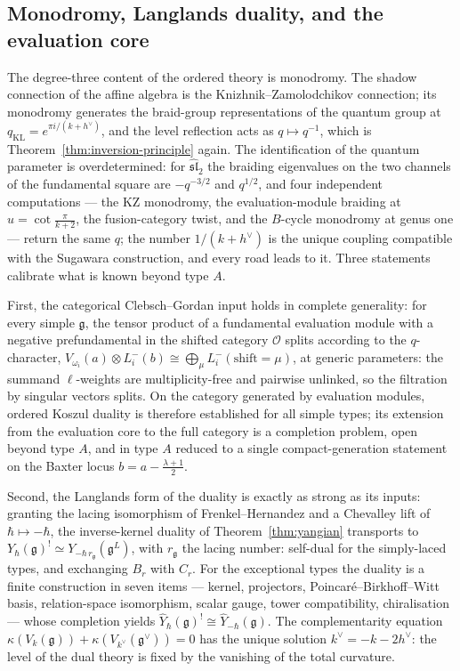 \documentclass[11pt]{amsart}
\numberwithin{equation}{section}
\theoremstyle{plain}
\theoremstyle{definition}
\theoremstyle{remark}
\newcommand{\fg}{\mathfrak{g}}
\newcommand{\dvee}{h^{\vee}}
\begin{document}
\subsection{Monodromy, Langlands duality, and the evaluation core}

The degree-three content of the ordered theory is monodromy. The shadow
connection of the affine algebra is the Knizhnik--Zamolodchikov
connection; its monodromy generates the braid-group representations of
the quantum group at $q_{\mathrm{KL}}=e^{\pi i/(k+\dvee)}$, and the
level reflection acts as $q\mapsto q^{-1}$, which is
Theorem~\ref{thm:inversion-principle} again. The identification of the
quantum parameter is overdetermined: for $\widehat{\mathfrak{sl}}_2$ the
braiding eigenvalues on the two channels of the fundamental square are
$-q^{-3/2}$ and $q^{1/2}$, and four independent computations --- the
KZ monodromy, the evaluation-module braiding at
$u=\cot\frac{\pi}{k+2}$, the fusion-category twist, and the
$B$-cycle monodromy at genus one --- return the same $q$; the number
$1/(k+\dvee)$ is the unique coupling compatible with the Sugawara
construction, and every road leads to it. Three statements calibrate
what is known beyond type $A$.

First, the categorical Clebsch--Gordan input holds in complete
generality: for every simple $\fg$, the tensor product of a fundamental
evaluation module with a negative prefundamental in the shifted
category \cite{HJ} $\mathcal{O}$ splits according to the $q$-character,
$V_{\omega_i}(a)\otimes L^{-}_{i}(b)\cong\bigoplus_{\mu}
L^{-}_{i}(\text{shift}=\mu)$, at generic parameters: the summand
$\ell$-weights are multiplicity-free and pairwise unlinked, so the
filtration by singular vectors splits. On the category generated by
evaluation modules, ordered Koszul duality is therefore established for
all simple types; its extension from the evaluation core to the full
category is a completion problem, open beyond type $A$, and in type $A$
reduced to a single compact-generation statement on the Baxter locus
$b=a-\tfrac{\lambda+1}{2}$.

Second, the Langlands form of the duality is exactly as strong as its
inputs: granting the lacing isomorphism of Frenkel--Hernandez \cite{FH} and a
Chevalley lift of $\hbar\mapsto-\hbar$, the inverse-kernel duality of
Theorem~\ref{thm:yangian} transports to
$Y_{\hbar}(\fg)^{!}\simeq Y_{-\hbar\,r_\fg}(\fg^{L})$, with
$r_\fg$ the lacing number: self-dual for the simply-laced types, and
exchanging $B_r$ with $C_r$. For the exceptional types the duality is
a finite construction in seven items --- kernel, projectors,
Poincar\'e--Birkhoff--Witt basis, relation-space isomorphism, scalar
gauge, tower compatibility, chiralisation --- whose completion yields
$\widehat Y_{\hbar}(\fg)^{!}\cong\widehat Y_{-\hbar}(\fg)$. The
complementarity equation
$\kappa(V_k(\fg))+\kappa(V_{k^{\vee}}(\fg^{\vee}))=0$ has the unique
solution $k^{\vee}=-k-2\dvee$: the level of the dual theory is fixed
by the vanishing of the total curvature.
\end{document}
